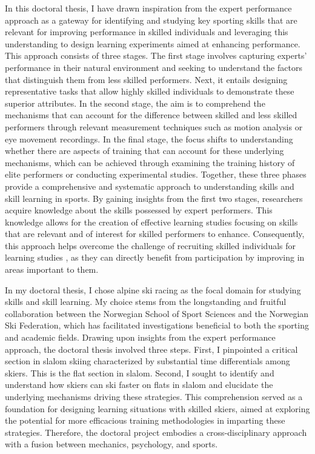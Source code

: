 In this doctoral thesis, I have drawn inspiration from the expert performance approach \cite{ericsson_development_2003, ericsson_prospects_2002, williams_using_2017, williams_perceptual-cognitive_2005} as a gateway for identifying and studying key sporting skills that are relevant for improving performance in skilled individuals and leveraging this understanding to design learning experiments aimed at enhancing performance. This approach consists of three stages. The first stage involves capturing experts' performance in their natural environment and seeking to understand the factors that distinguish them from less skilled performers. Next, it entails designing representative tasks that allow highly skilled individuals to demonstrate these superior attributes. In the second stage, the aim is to comprehend the mechanisms that can account for the difference between skilled and less skilled performers through relevant measurement techniques such as motion analysis or eye movement recordings. In the final stage, the focus shifts to understanding whether there are aspects of training that can account for these underlying mechanisms, which can be achieved through examining the training history of elite performers or conducting experimental studies. Together, these three phases provide a comprehensive and systematic approach to understanding skills and skill learning in sports. By gaining insights from the first two stages, researchers acquire knowledge about the skills possessed by expert performers. This knowledge allows for the creation of effective learning studies focusing on skills that are relevant and of interest for skilled performers to enhance. Consequently, this approach helps overcome the challenge of recruiting skilled individuals for learning studies \cite{farrow_chapter_2017, buszard_quantifying_2017}, as they can directly benefit from participation by improving in areas important to them.

In my doctoral thesis, I chose alpine ski racing as the focal domain for studying skills and skill learning. My choice stems from the longstanding and fruitful collaboration between the Norwegian School of Sport Sciences and the Norwegian Ski Federation, which has facilitated investigations beneficial to both the sporting and academic fields. Drawing upon insights from the expert performance approach, the doctoral thesis involved three steps. First, I  pinpointed a critical section in slalom skiing characterized by substantial time differentials among skiers. This is the flat section in slalom. Second, I sought to identify and understand how skiers can ski faster on flats in slalom and elucidate the underlying mechanisms driving these strategies. This comprehension served as a foundation for designing learning situations with skilled skiers, aimed at exploring the potential for more efficacious training methodologies in imparting these strategies. Therefore, the doctoral project embodies a cross-disciplinary approach with a fusion between mechanics, psychology, and sports.

